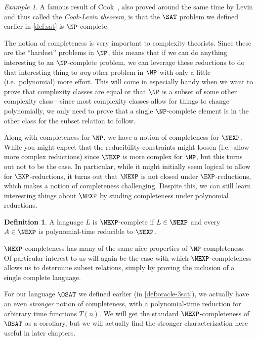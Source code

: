 \documentclass[english,12pt]{reedthesis}
\theoremstyle{plain}
\theoremstyle{definition}
\newtheorem{defn}[defn]{Definition}
\theoremstyle{remark}
\newtheorem{example}{Example}[thm]
\begin{document}
\begin{example}\label{ex:sat-is-complete}
  A famous result of Cook~\cite{Cook71}, also proved around the same time by
  Levin and thus called the \emph{Cook-Levin theorem}, is that the $\SAT$
  problem we defined earlier in \cref{def:sat} is $\NP$-complete.
\end{example}

The notion of completeness is very important to complexity theorists. Since
these are the ``hardest'' problems in $\NP$, this means that if we can do
anything interesting to an $\NP$-complete problem, we can leverage these
reductions to do that interesting thing to \emph{any} other problem in $\NP$
with only a little (i.e.\ polynomial) more effort. This will come in especially
handy when we want to prove that complexity classes are equal or that $\NP$ is a
subset of some other complexity class---since most complexity classes allow for
things to change polynomially, we only need to prove that a single
$\NP$-complete element is in the other class for the subset relation to follow.

Along with completeness for $\NP$, we have a notion of completeness for $\NEXP$.
While you might expect that the reducibility constraints might loosen (i.e.\
allow more complex reductions) since $\NEXP$ is more complex for $\NP$, but this
turns out not to be the case. In particular, while it might initially seem
logical to allow for $\EXP$-reductions, it turns out that $\NEXP$ is not closed
under $\EXP$-reductions, which makes a notion of completeness challenging.
Despite this, we can still learn interesting things about $\NEXP$ by studing
completeness under polynomial reductions.

\begin{defn}\label{def:nexp-complete}
  A language $L$ is $\NEXP$-complete if $L \in \NEXP$ and every $A \in \NEXP$ is
  polynomial-time reducible to $\NEXP$.
\end{defn}

$\NEXP$-completeness has many of the same nice properties of $\NP$-completeness.
Of particular interest to us will again be the ease with which
$\NEXP$-completeness allows us to determine subset relations, simply by proving
the inclusion of a single complete language.

For our language $\OSAT$ we defined earlier (in \cref{def:oracle-3sat}), we
actually have an even \emph{stronger} notion of completeness, with a
polynomial-time reduction for arbitrary time functions $T(n)$. We will get the
standard $\NEXP$-completeness of $\OSAT$ as a corollary, but we will actually
find the stronger characterization here useful in later chapters.
\end{document}
